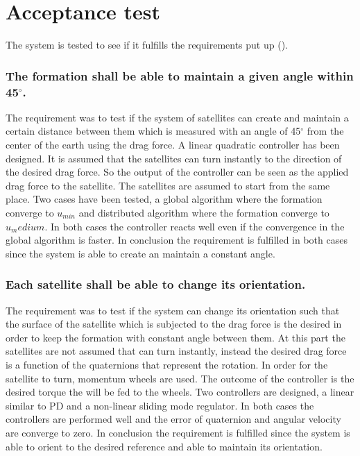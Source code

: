\chapter{Acceptance test} \label{chap:acceptanceTest}
The system is tested to see if it fulfills the requirements put up ().

\subsection{The formation shall be able to maintain a given angle within 45$^{\circ}$.}
%
The requirement was to test if the system of satellites can create and maintain a certain distance between them which is measured with an angle of 45$^{\circ}$ from the center of the earth using the drag force. A linear quadratic controller has been designed. It is assumed that the satellites can turn instantly to the direction of the desired drag force. So the output of the controller can be seen as the applied drag force to the satellite.        
%
The satellites are assumed to start from the same place. Two cases have been tested, a global algorithm where the formation converge to $u_{min}$ and distributed algorithm where the formation converge to $u_medium$. In both cases the controller reacts well even if the convergence in the global algorithm is faster.
%
In conclusion the requirement is fulfilled in both cases since the system is able to create an maintain a constant angle.  
\subsection{Each satellite shall be able to change its orientation.}
%
The requirement was to test if the system can change its orientation such that the surface of the satellite which is subjected to the drag force is the desired in order to keep the formation with constant angle between them. At this part the satellites are not assumed that can turn instantly, instead the desired drag force is a function of the quaternions that represent the rotation. In order for the satellite to turn, momentum wheels are used. The outcome of the controller is the desired torque the will be fed to the wheels. Two controllers are designed, a linear similar to PD and a non-linear sliding mode regulator. In both cases the controllers are performed well and the error of quaternion and angular velocity are converge to zero. In conclusion the requirement is fulfilled since the system is able to orient to the desired reference and able to maintain its orientation. 

